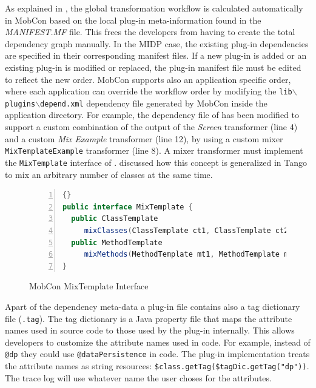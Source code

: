 As explained in , the global transformation workflow is calculated automatically in MobCon based on the local plug-in meta-information found in the \textit{MA\-NI\-FEST.MF} file. This frees the developers from having to create the total dependency graph manually. In the MIDP case, the existing plug-in dependencies are specified in their corresponding manifest files. If a new plug-in is added or an existing plug-in is modified or replaced, the plug-in manifest file must be edited to reflect the new order. MobCon supports also an application specific order, where each application can override the workflow order by modifying the \texttt{lib$\backslash$plugins$\backslash$de\-pend.xml} dependency file generated by MobCon inside the application directory. For example, the dependency file of  has been modified to support a custom combination of the output of the \textit{Screen} transformer (line 4) and a custom \textit{Mix Example} transformer (line 12), by using a custom mixer \texttt{Mix\-Tem\-pla\-te\-Exa\-mple} transformer (line 8). A mixer transformer must implement the \texttt{Mix\-Tem\-pla\-te} interface of .  discussed how this concept is generalized in Tango to mix an arbitrary number of classes at the same time.

\begin{figure}[ht]
\begin{center}
\begin{minipage}{12cm}
\begin{scriptsize}
\begin{lstlisting}[numbers=left,language=Java,frame=leftline]{}
public interface MixTemplate {
  public ClassTemplate 
     mixClasses(ClassTemplate ct1, ClassTemplate ct2);
  public MethodTemplate 
     mixMethods(MethodTemplate mt1, MethodTemplate mt2);
}	
\end{lstlisting}
\end{scriptsize}
\end{minipage}
\end{center}
\caption{MobCon MixTemplate Interface}
\label{fig:mix}
\end{figure}

Apart of the dependency meta-data a plug-in file contains also a tag dictionary file (\texttt{.tag}). The tag dictionary is a Java property file that maps the attribute names used in source code to those used by the plug-in internally. This allows developers to customize the attribute names used in code. For example, instead of \texttt{@dp} they could use \texttt{@da\-ta\-Per\-si\-sten\-ce} in code. The plug-in implementation treats the attribute names as string resources: \texttt{\$class.\-get\-Tag(\$tag\-Dic.\-get\-Tag("dp"))}. The trace log will use whatever name the user choses for the attributes.

